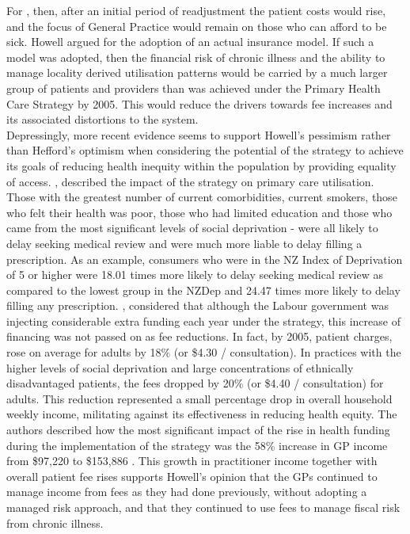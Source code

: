 \documentclass[11pt,a4paper]{article}
\begin{document}
For \citet{howell2005restructuring}, then, after an initial period of readjustment the patient costs would rise, and the focus of General Practice would remain on those who can afford to be sick. Howell argued for the adoption of an actual insurance model. If such a model was adopted, then the financial risk of chronic illness and the ability to manage locality derived utilisation patterns would be carried by a much larger group of patients and providers than was achieved under the Primary Health Care Strategy by 2005. This would reduce the drivers towards fee increases and its associated distortions to the system.\\

Depressingly, more recent evidence seems to support Howell's pessimism rather than Hefford's optimism when considering the potential of the strategy to achieve its goals of reducing health inequity within the population by providing equality of access. \citet{jatrana2009primary}, described the impact of the strategy on primary care utilisation. Those with the greatest number of current comorbidities, current smokers, those who felt their health was poor, those who had limited education and those who came from the most significant levels of social deprivation - were all likely to delay seeking medical review and were much more liable to delay filling a prescription.  As an example, consumers who were in the NZ Index of Deprivation of 5 or higher were 18.01 times more likely to delay seeking medical review as compared to the lowest group in the NZDep and 24.47 times more likely to delay filling any prescription. \citet{cumming2008reforming}, considered  that although the Labour government was injecting considerable extra funding each year under the strategy, this increase of financing was not passed on as fee reductions.  In fact, by 2005, patient charges, rose on average for adults by 18\% (or \$4.30 / consultation). In practices with the higher levels of social deprivation and large concentrations of ethnically disadvantaged patients, the fees dropped by 20\% (or \$4.40 / consultation) for adults. This reduction represented a small percentage drop in overall household weekly income, militating against its effectiveness in reducing health equity.  The authors described how the most significant impact of the rise in health funding during the implementation of the strategy was the 58\% increase in GP income from \$97,220 to \$153,886 \citep{cumming2008reforming}. This growth in practitioner income together with overall patient fee rises supports Howell's opinion that the GPs continued to manage income from fees as they had done previously, without adopting a managed risk approach, and that they continued to use fees to manage fiscal risk from chronic illness. \\
\end{document}
